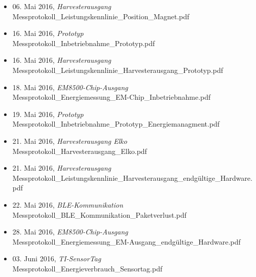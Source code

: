 \begin{itemize}
\item 06. Mai 2016, \emph{Harvesterausgang}\\
Messprotokoll\_Leistungskennlinie\_Position\_Magnet.pdf
\item 16. Mai 2016, \emph{Prototyp}\\
Messprotokoll\_Inbetriebnahme\_Prototyp.pdf
\item 16. Mai 2016, \emph{Harvesterausgang}\\
Messprotokoll\_Leistungskennlinie\_Harvesterausgang\_Prototyp.pdf
\item 18. Mai 2016, \emph{EM8500-Chip-Ausgang}\\
Messprotokoll\_Energiemessung\_EM-Chip\_Inbetriebnahme.pdf
\item 19. Mai 2016, \emph{Prototyp}\\
Messprotokoll\_Inbetriebnahme\_Prototyp\_Energiemanagment.pdf
\item 21. Mai 2016, \emph{Harvesterausgang Elko}\\
Messprotokoll\_Harvesterausgang\_Elko.pdf
\item 21. Mai 2016, \emph{Harvesterausgang}\\
Messprotokoll\_Leistungskennlinie\_Harvesterausgang\_endgültige\_Hardware.pdf
\item 22. Mai 2016, \emph{BLE-Kommunikation}\\
Messprotokoll\_BLE\_Kommunikation\_Paketverlust.pdf
\item 28. Mai 2016, \emph{EM8500-Chip-Ausgang}\\
Messprotokoll\_Energiemessung\_EM-Ausgang\_endgültige\_Hardware.pdf
\item 03. Juni 2016, \emph{TI-SensorTag}\\
Messprotokoll\_Energieverbrauch\_Sensortag.pdf
\end{itemize}

